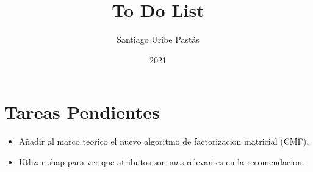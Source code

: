 \documentclass{article}
\title{To Do List}
\author{Santiago Uribe Pastás}
\date{2021}
\begin{document}
\maketitle

\section{Tareas Pendientes}
\begin{itemize}
    \item Añadir al marco teorico el nuevo algoritmo de factorizacion matricial (CMF).
    \item Utlizar shap para ver que atributos son mas relevantes en la recomendacion.
\end{itemize}
\end{document}
